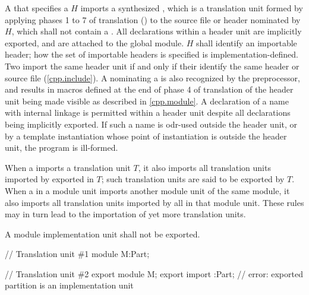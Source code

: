 \begin{std.txt}
  \alinea
  A  that specifies
  a  $H$ imports
  a synthesized ,
  which is a translation unit formed by applying
  phases 1 to 7 of translation ()
  to the source file or header nominated by $H$,
  which shall not contain a .
  \enternote
  All declarations within a header unit are implicitly
  exported, and are attached to the global module.
  \exitnote
  $H$ shall identify an importable header;
  how the set of importable headers is specified
  is implementation-defined.
  Two
  import the same header unit if and only if
  their  identify the same
  header or source file (\ref{cpp.include}).
  \enternote
  A  nominating
  a  is also recognized by the
  preprocessor, and results in macros defined at the
  end of phase 4 of translation of the header unit
  being made visible as described in \ref{cpp.module}.
  \exitnote
  A declaration of a name with internal linkage is
  permitted within a header unit despite all
  declarations being implicitly exported.
  If such a name is odr-used outside the
  header unit, or by a template
  instantiation whose point of instantiation is outside
  the header unit, the program is ill-formed.

  \alinea
  When a  imports
  a translation unit $T$, it also imports
  all translation units imported by
  exported 
  in $T$; such translation units are
  said to be exported by $T$.
  When a  in a module unit imports
  another module unit of the same module, it also imports
  all translation units imported by
  all 
  in that module unit.
  These rules may in turn lead to the importation of yet more
  translation units.

  \alinea
  \color{addclr}
  A module implementation unit shall not be exported.
  \begin{example}
  \begin{Program}
// Translation unit \#1
module M:Part;

// Translation unit \#2
export module M;
export import :Part;    // error: exported partition  is an implementation unit
  \end{Program}
  \end{example}


\end{std.txt}
